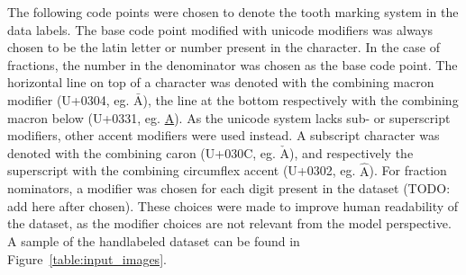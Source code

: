 \documentclass{article}
\begin{document}
The following code points were chosen to denote the tooth marking system in the data labels.
The base code point modified with unicode modifiers was always chosen to be the latin letter or number present in the character. In the case of 
fractions, the number in the denominator was chosen as the base code point. The horizontal line on top of a character was denoted with the
combining macron modifier (U+0304, eg. $\bar{\text{A}}$), the line at the bottom respectively with the combining macron below (U+0331, eg. \underline{A}).
As the unicode system lacks sub- or superscript modifiers, other accent modifiers were used instead. A subscript character was denoted with the combining caron (U+030C, eg. $\check{\mathrm{A}}$), and respectively the superscript with the combining
circumflex accent (U+0302, eg. $\hat{\text{A}}$). For fraction nominators, a modifier was chosen for each digit present in the dataset (TODO: add here after chosen).
These choices were made to improve human readability of the dataset, as the modifier choices are not relevant from the model perspective. A sample of the handlabeled 
dataset can be found in Figure~\ref{table:input_images}.
\end{document}
